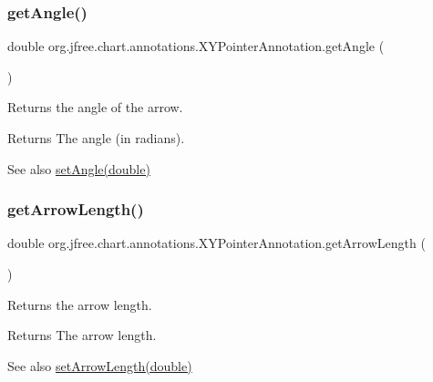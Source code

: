 \subsubsection{\texorpdfstring{get\+Angle()}{getAngle()}}
{\footnotesize\ttfamily double org.\+jfree.\+chart.\+annotations.\+X\+Y\+Pointer\+Annotation.\+get\+Angle (\begin{DoxyParamCaption}{ }\end{DoxyParamCaption})}

Returns the angle of the arrow.

\begin{DoxyReturn}{Returns}
The angle (in radians).
\end{DoxyReturn}
\begin{DoxySeeAlso}{See also}
\mbox{\hyperlink{classorg_1_1jfree_1_1chart_1_1annotations_1_1_x_y_pointer_annotation_aae1dfb849164ad0d6ed651dcbd195b3f}{set\+Angle(double)}} 
\end{DoxySeeAlso}
\mbox{\label{classorg_1_1jfree_1_1chart_1_1annotations_1_1_x_y_pointer_annotation_acd4f8668892f3f126915d73efd70135b}} 
\subsubsection{\texorpdfstring{get\+Arrow\+Length()}{getArrowLength()}}
{\footnotesize\ttfamily double org.\+jfree.\+chart.\+annotations.\+X\+Y\+Pointer\+Annotation.\+get\+Arrow\+Length (\begin{DoxyParamCaption}{ }\end{DoxyParamCaption})}

Returns the arrow length.

\begin{DoxyReturn}{Returns}
The arrow length.
\end{DoxyReturn}
\begin{DoxySeeAlso}{See also}
\mbox{\hyperlink{classorg_1_1jfree_1_1chart_1_1annotations_1_1_x_y_pointer_annotation_ab54bd7dea136f2cdeeece616bc0b51d3}{set\+Arrow\+Length(double)}} 
\end{DoxySeeAlso}
\mbox{\label{classorg_1_1jfree_1_1chart_1_1annotations_1_1_x_y_pointer_annotation_ac53a34b1e682d8e7dc1df7ec30ee7e46}} 
